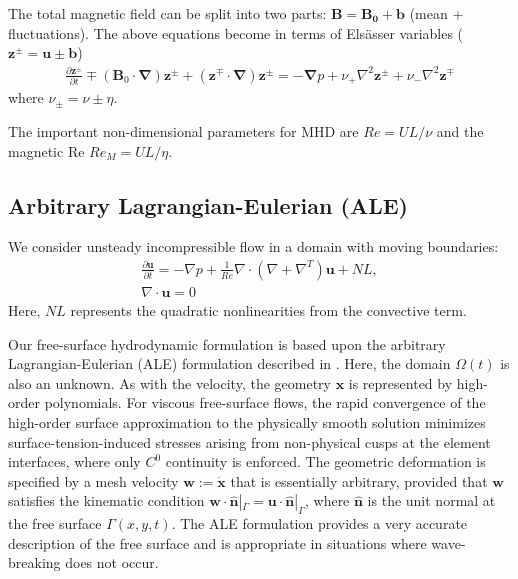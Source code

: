 \documentclass[letterpaper,10pt,english]{sphinxmanual}
\begin{document}
The total magnetic field can be split into two parts: \(\mathbf{B} = \mathbf{B_0} +
\mathbf{b}\) (mean + fluctuations). The above equations become in terms of Elsässer variables
(\(\mathbf{z}^{\pm} =  \mathbf{u} \pm \mathbf{b}\))
\begin{equation*}
\begin{split}\frac{\partial {\mathbf{z}^{\pm}}}{\partial t}\mp\left(\mathbf {B}_0\cdot{\mathbf \nabla}\right){\mathbf z^{\pm}} + \left({\mathbf z^{\mp}}\cdot{\mathbf \nabla}\right){\mathbf z^{\pm}} = -{\mathbf \nabla}p
+ \nu_+ \nabla^2 \mathbf{z}^{\pm} + \nu_- \nabla^2 \mathbf{z}^{\mp}\end{split}
\end{equation*}
where \(\nu_\pm = \nu \pm \eta\).

The important non-dimensional parameters for MHD are \(Re = U L /\nu\) and the magnetic Re \(Re_M = U L /\eta\).


\subsection{Arbitrary Lagrangian-Eulerian (ALE)}
\label{\detokenize{theory:arbitrary-lagrangian-eulerian-ale}}
We consider unsteady incompressible flow in a domain with moving boundaries:
\begin{equation}\label{equation:theory:mhd1}
\begin{split}\frac{\partial\mathbf u}{\partial t} = -\nabla p +\frac{1}{Re}\nabla\cdot(\nabla + \nabla^T)\mathbf u  + NL,\\
\nabla \cdot \mathbf u = 0\end{split}
\end{equation}
Here, \(NL\) represents the quadratic nonlinearities from the convective term.

Our free-surface hydrodynamic formulation is based upon the arbitrary Lagrangian-Eulerian (ALE)
formulation described in \label{\detokenize{theory:id4}}{\hyperref[\detokenize{bibliography:ho1989}]{\sphinxcrossref{{[}Ho1989{]}}}}.  Here, the domain \(\Omega(t)\) is also an unknown.  As
with the velocity, the geometry \(\mathbf x\) is represented by high-order polynomials.  For
viscous free-surface flows, the rapid convergence of the high-order surface approximation to the
physically smooth solution minimizes surface-tension-induced stresses arising from non-physical
cusps at the element interfaces, where only \(C^0\) continuity is enforced.  The geometric
deformation is specified by a mesh velocity \(\mathbf w := \dot{\mathbf x}\) that is
essentially arbitrary, provided that \(\mathbf w\) satisfies the kinematic condition
\(\mathbf w \cdot \hat{\mathbf n}|^{}_{\Gamma} = \mathbf u \cdot \hat{\mathbf
n}|^{}_{\Gamma}\), where \(\hat{\mathbf n}\) is the unit normal at the free surface
\(\Gamma(x,y,t)\).  The ALE formulation provides a very accurate description of the free
surface and is appropriate in situations where wave-breaking does not occur.
\end{document}
